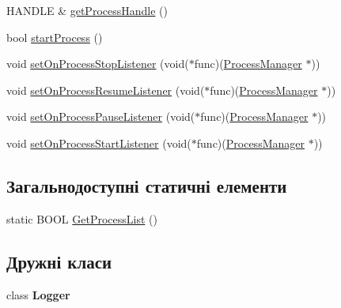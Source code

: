 \begin{DoxyCompactItemize}
\item 
H\+A\+N\+D\+L\+E \& \hyperlink{class_process_manager_a9ef3daadbc5c9fbadf2b27959fa6ad48}{get\+Process\+Handle} ()
\item 
bool \hyperlink{class_process_manager_a2b7cdddccd6e70b341075f2f69422948}{start\+Process} ()
\item 
void \hyperlink{class_process_manager_a14bf654b6b333cf41b632c49d9a8efef}{set\+On\+Process\+Stop\+Listener} (void($\ast$func)(\hyperlink{class_process_manager}{Process\+Manager} $\ast$))
\item 
void \hyperlink{class_process_manager_a719434f2fe5c003f355b712dcddad850}{set\+On\+Process\+Resume\+Listener} (void($\ast$func)(\hyperlink{class_process_manager}{Process\+Manager} $\ast$))
\item 
void \hyperlink{class_process_manager_a0c0a42010c6e7949fc6cbebf853cbceb}{set\+On\+Process\+Pause\+Listener} (void($\ast$func)(\hyperlink{class_process_manager}{Process\+Manager} $\ast$))
\item 
void \hyperlink{class_process_manager_a97612a29cefa1f517635e096c1e91691}{set\+On\+Process\+Start\+Listener} (void($\ast$func)(\hyperlink{class_process_manager}{Process\+Manager} $\ast$))
\end{DoxyCompactItemize}
\subsection*{Загальнодоступні статичні елементи}
\begin{DoxyCompactItemize}
\item 
static B\+O\+O\+L \hyperlink{class_process_manager_a3d9add158edf3b5112981bf231394c41}{Get\+Process\+List} ()
\end{DoxyCompactItemize}
\subsection*{Дружні класи}
\begin{DoxyCompactItemize}
\item 
\hypertarget{class_process_manager_aff02b76416d2846736b7ecd798921a0a}{class {\bfseries Logger}}\label{class_process_manager_aff02b76416d2846736b7ecd798921a0a}

\end{DoxyCompactItemize}


